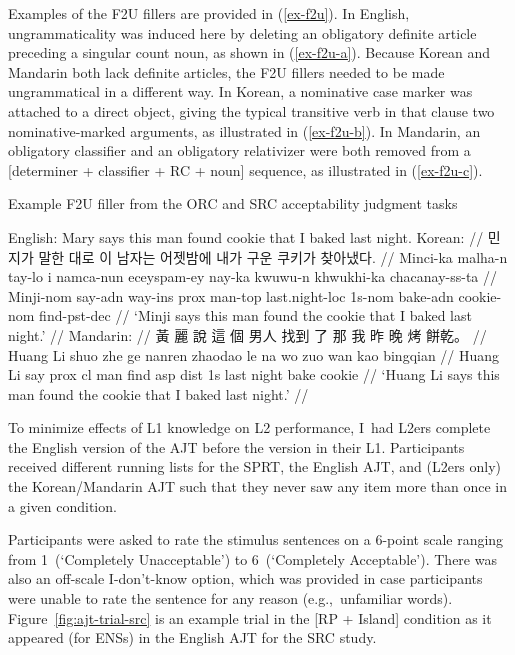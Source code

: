 Examples of the F2U fillers are provided in (\ref{ex-f2u}). In English, ungrammaticality was induced here by deleting an obligatory definite article preceding a singular count noun, as shown in (\ref{ex-f2u-a}). Because Korean and Mandarin both lack definite articles, the F2U fillers needed to be made ungrammatical in a different way. In Korean, a nominative case marker was attached to a direct object, giving the typical transitive verb in that clause two nominative-marked arguments, as illustrated in (\ref{ex-f2u-b}). In Mandarin, an obligatory classifier and an obligatory relativizer were both removed from a [determiner + classifier + RC + noun] sequence, as illustrated in (\ref{ex-f2u-c}).

\pex Example F2U filler from the ORC and SRC acceptability judgment tasks \label{ex-f2u} \par\nobreak
\a English:\label{ex-f2u-a}\vspace{2pt}\newline
\ljudge*Mary says this man found cookie that I baked last night.
\a 
\begingl
\glpreamble Korean:\label{ex-f2u-b} //
\gla \ljudge*\ko 민지가 \ko 말한 \ko 대로 \ko 이 \ko 남자는 \ko 어젯밤에 \ko 내가 \ko 구운 \ko 쿠키가 \ko 찾아냈다. //
\glb Minci-ka malha-n tay-lo i namca-nun eceyspam-ey nay-ka kwuwu-n khwukhi-ka chacanay-ss-ta //
\glc Minji-{\sc nom} say-{\sc adn} way-{\sc ins} {\sc prox} man-{\sc top} last.night-{\sc loc} {\sc 1s-nom} bake-{\sc adn} cookie-{\sc nom} find-{\sc pst-dec} //
\glft `Minji says this man found the cookie that I baked last night.' //
\endgl 
\a 
\begingl
\glpreamble Mandarin:\label{ex-f2u-c} //
\gla \ljudge*\zh 黃 \zh 麗 \zh 說 \zh 這 \zh 個 \zh 男人 \zh 找到 \zh 了 \zh 那 \zh 我 \zh 昨 \zh 晚 \zh 烤 \zh 餅乾。 //
\glb Huang Li shuo zhe ge nanren zhaodao le na wo zuo wan kao bingqian //
\glc Huang Li say {\sc prox} {\sc cl} man find {\sc asp} {\sc dist} {\sc 1s} last night bake cookie //
\glft `Huang Li says this man found the cookie that I baked last night.' //
\endgl 
\xe 

To minimize effects of L1 knowledge on L2 performance, I~had L2ers complete the English version of the AJT before the version in their L1. Participants received different running lists for the SPRT, the English AJT, and (L2ers only) the Korean/Mandarin AJT such that they never saw any item more than once in a given condition.

Participants were asked to rate the stimulus sentences on a 6-point scale ranging from 1~(`Completely Unacceptable') to 6~(`Completely Acceptable'). There was also an off-scale I-don't-know option, which was provided in case participants were unable to rate the sentence for any reason (e.g.,~unfamiliar words). Figure~\ref{fig:ajt-trial-src} is an example trial in the [RP + Island] condition as it appeared (for ENSs) in the English AJT for the SRC study.

